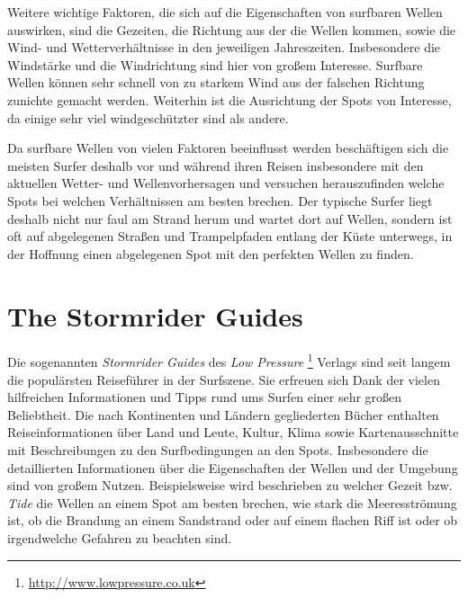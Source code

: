 Weitere wichtige Faktoren, die sich auf die Eigenschaften von
surfbaren Wellen auswirken, sind die Gezeiten, die Richtung aus der
die Wellen kommen, sowie die Wind- und Wetterverhältnisse in den
jeweiligen Jahreszeiten. Insbesondere die Windstärke und die
Windrichtung sind hier von großem Interesse. Surfbare Wellen können
sehr schnell von zu starkem Wind aus der falschen Richtung zunichte
gemacht werden. Weiterhin ist die Ausrichtung der Spots von Interesse,
da einige sehr viel windgeschützter sind als andere.

Da surfbare Wellen von vielen Faktoren beeinflusst werden beschäftigen
sich die meisten Surfer deshalb vor und während ihren Reisen
insbesondere mit den aktuellen Wetter- und Wellenvorhersagen und
versuchen herauszufinden welche Spots bei welchen Verhältnissen am
besten brechen. Der typische Surfer liegt deshalb nicht nur faul am
Strand herum und wartet dort auf Wellen, sondern ist oft auf
abgelegenen Straßen und Trampelpfaden entlang der Küste unterwegs, in
der Hoffnung einen abgelegenen Spot mit den perfekten Wellen zu
finden.

\section{The Stormrider Guides}
Die sogenannten \textit{Stormrider Guides} des \textit{Low Pressure}
\footnote{\url{http://www.lowpressure.co.uk}} Verlags sind seit langem
die populärsten Reiseführer in der Surfszene. Sie erfreuen sich Dank
der vielen hilfreichen Informationen und Tipps rund ums Surfen einer
sehr großen Beliebtheit. Die nach Kontinenten und Ländern gegliederten
Bücher enthalten Reiseinformationen über Land und Leute, Kultur, Klima
sowie Kartenausschnitte mit Beschreibungen zu den Surfbedingungen an
den Spots. Insbesondere die detaillierten Informationen über die
Eigenschaften der Wellen und der Umgebung sind von großem
Nutzen. Beispielsweise wird beschrieben zu welcher Gezeit
bzw. \textit{Tide} die Wellen an einem Spot am besten brechen, wie
stark die Meeresströmung ist, ob die Brandung an einem Sandstrand oder
auf einem flachen Riff ist oder ob irgendwelche Gefahren zu beachten
sind. 

